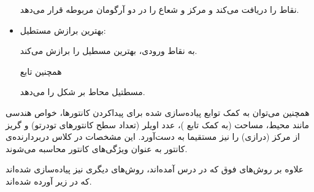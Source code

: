 \documentclass[12pt,a4paper]{article}
\theoremstyle{definition}
\theoremstyle{theorem}
\theoremstyle{definition}
\begin{document}
\begin{itemize}


نقاط را دریافت می‌کند و مرکز و شعاع را در دو آرگومان مربوطه قرار می‌دهد. 


\item
بهترین برازش مستطیل:
 
\begin{flushleft}
\end{flushleft}
به نقاط ورودی، بهترین مسطیل را برازش می‌کند.

همچنین تابع

\begin{flushleft}
\end{flushleft}

مسطتیل محاط بر شکل را می‌دهد.

\end{itemize}


همچنین می‌توان به کمک توابع پیاده‌سازی‌ شده برای پیداکردن کانتورها، خواص هندسی مانند محیط، مساحت (به کمک تابع 
)، عدد اویلر (تعداد سطح کانتورهای تودرتو) و گریز از مرکز (درازی) را نیز مستقیما به دست‌آورد. این مشخصات در کلاس دربردارنده‌ی کانتور به عنوان ویژگی‌های کانتور محاسبه می‌شوند. 

علاوه بر روش‌های فوق که در درس آمده‌اند، روش‌های دیگری نیز پیاده‌سازی شده‌اند که در زیر آورده‌ شده‌اند. 
\end{document}
